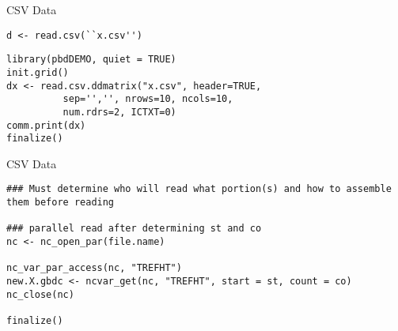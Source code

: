 \begin{frame}
  \begin{exampleblock}{CSV Data}\pause
\begin{lstlisting}[title=Serial Code]
d <- read.csv(``x.csv'')
\end{lstlisting}

\begin{lstlisting}[title=Parallel Code 0\_readcsv.r]
library(pbdDEMO, quiet = TRUE)
init.grid()
dx <- read.csv.ddmatrix("x.csv", header=TRUE,
          sep='','', nrows=10, ncols=10,
          num.rdrs=2, ICTXT=0)
comm.print(dx)
finalize()
\end{lstlisting}
  \end{exampleblock}
\end{frame}

\begin{frame}
  \begin{exampleblock}{CSV Data}\pause
    \begin{lstlisting}[title=NetCDF4 Files]
### Must determine who will read what portion(s) and how to assemble
them before reading

### parallel read after determining st and co
nc <- nc_open_par(file.name)

nc_var_par_access(nc, "TREFHT")
new.X.gbdc <- ncvar_get(nc, "TREFHT", start = st, count = co)
nc_close(nc)

finalize()
    \end{lstlisting}
  \end{exampleblock}
\end{frame}

